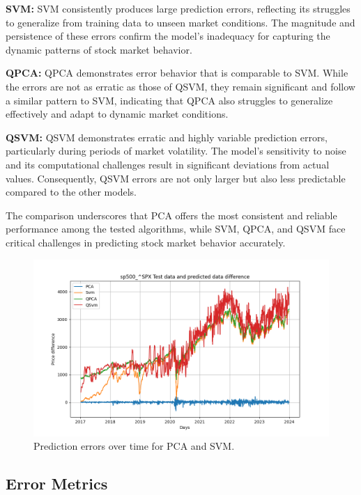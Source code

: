 \documentclass[journal]{IEEEtran}
\begin{document}
\textbf{SVM:} SVM consistently produces large prediction errors, reflecting its struggles to generalize from training data to unseen market conditions. The magnitude and persistence of these errors confirm the model's inadequacy for capturing the dynamic patterns of stock market behavior.

\textbf{QPCA:} QPCA demonstrates error behavior that is comparable to SVM. While the errors are not as erratic as those of QSVM, they remain significant and follow a similar pattern to SVM, indicating that QPCA also struggles to generalize effectively and adapt to dynamic market conditions.

\textbf{QSVM:} QSVM demonstrates erratic and highly variable prediction errors, particularly during periods of market volatility. The model's sensitivity to noise and its computational challenges result in significant deviations from actual values. Consequently, QSVM errors are not only larger but also less predictable compared to the other models.

The comparison underscores that PCA offers the most consistent and reliable performance among the tested algorithms, while SVM, QPCA, and QSVM face critical challenges in predicting stock market behavior accurately.


\begin{figure}[ht!]
    \centering
    \includegraphics[width=\linewidth]{prediction_error.png}
    \caption{Prediction errors over time for PCA and SVM.}
    \label{fig:error_comparison}
\end{figure}

\subsection{Error Metrics}
\end{document}
